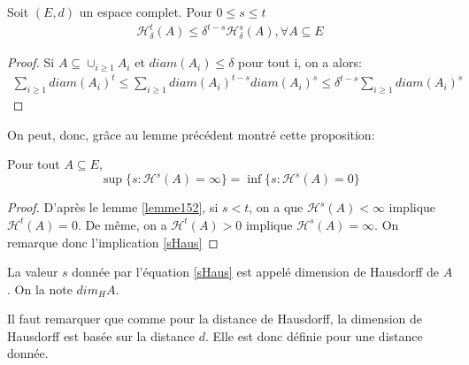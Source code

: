 \documentclass[a4paper, 12pt]{report}
\begin{document}
			
			
			\begin{lemma}
			\label{lemme152}
				Soit $(E,d)$ un espace complet. Pour $0\leq s\leq t$
				\begin{align*}
					\mathscr{H}^t_\delta(A)\leq\delta^{t-s}\mathscr{H}^s_\delta(A),\forall A\subseteq E
				\end{align*}
			\end{lemma}
			\begin{proof}
				Si $A\subseteq \cup_{i\geq 1} A_i$ et $diam(A_i)\leq\delta$ pour tout i, on a alors:
				\begin{align*}
					\sum_{i\geq1}diam(A_i)^t\leqslant\sum_{i\geq1}diam(A_i)^{t-s}diam(A_i)^s\leqslant\delta^{t-s}\sum_{i\geq1}diam(A_i)^s
				\end{align*}
			\end{proof}
\newpage
			On peut, donc, grâce au lemme précédent montré cette proposition:
			\begin{prop}
				Pour tout $A\subseteq E$,
				\begin{equation}
					\label{sHaus}
					\sup\{s:\mathscr{H}^s(A)=\infty\}=\inf\{s:\mathscr{H}^s(A)=0\}
				\end{equation}
			\end{prop}
			\begin{proof}
				D'après le lemme \ref{lemme152}, si $s<t$, on a que $\mathscr{H}^s(A)<\infty$ implique $\mathscr{H}^t(A)=0$. De  même, on a $\mathscr{H}^t(A)>0$ implique $\mathscr{H}^s(A)=\infty$. On remarque donc l'implication \ref{sHaus}
			\end{proof}
			
			
			\begin{definition}
				La valeur $s$ donnée par l'équation \ref{sHaus} est appelé dimension de Hausdorff de $A$. On la note $dim_H A$.
			\end{definition}
			\begin{remark*}
				Il faut remarquer que comme pour la distance de Hausdorff, la dimension de Hausdorff est basée sur la distance $d$. Elle est donc définie pour une distance donnée.
			\end{remark*}
			
\end{document}
